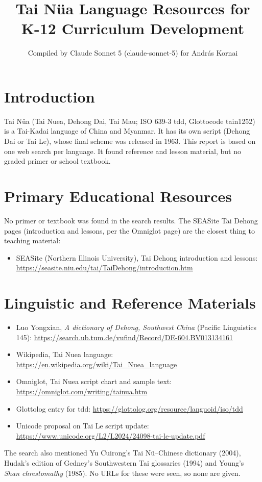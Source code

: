 \documentclass[12pt]{article}
\title{Tai N\"ua Language Resources for K-12 Curriculum Development}
\author{Compiled by Claude Sonnet 5 (claude-sonnet-5) for Andr\'as Kornai}
\date{}
\begin{document}
\maketitle
\section{Introduction}
Tai N\"ua (Tai Nuea, Dehong Dai, Tai Mau; ISO 639-3 tdd, Glottocode tain1252) is a Tai-Kadai language of China and Myanmar. It has its own script (Dehong Dai or Tai Le), whose final scheme was released in 1963. This report is based on one web search per language. It found reference and lesson material, but no graded primer or school textbook.
\section{Primary Educational Resources}
No primer or textbook was found in the search results. The SEASite Tai Dehong pages (introduction and lessons, per the Omniglot page) are the closest thing to teaching material:
\begin{itemize}
\item SEASite (Northern Illinois University), Tai Dehong introduction and lessons: \url{https://seasite.niu.edu/tai/TaiDehong/introduction.htm}
\end{itemize}
\section{Linguistic and Reference Materials}
\begin{itemize}
\item Luo Yongxian, \emph{A dictionary of Dehong, Southwest China} (Pacific Linguistics 145): \url{https://search.ub.tum.de/vufind/Record/DE-604.BV013134161}
\item Wikipedia, Tai Nuea language: \url{https://en.wikipedia.org/wiki/Tai_Nuea_language}
\item Omniglot, Tai Nuea script chart and sample text: \url{https://omniglot.com/writing/tainua.htm}
\item Glottolog entry for tdd: \url{https://glottolog.org/resource/languoid/iso/tdd}
\item Unicode proposal on Tai Le script update: \url{https://www.unicode.org/L2/L2024/24098-tai-le-update.pdf}
\end{itemize}
The search also mentioned Yu Cuirong's Tai N\"u--Chinese dictionary (2004), Hudak's edition of Gedney's Southwestern Tai glossaries (1994) and Young's \emph{Shan chrestomathy} (1985). No URLs for these were seen, so none are given.
\end{document}
